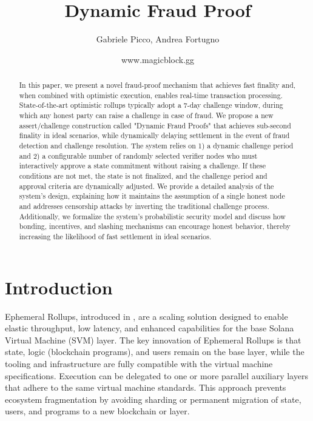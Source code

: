 \documentclass{article}
\title{\textbf{Dynamic Fraud Proof}}
\author{Gabriele Picco, Andrea Fortugno}
\date{www.magicblock.gg}
\begin{document}
\maketitle

\begin{abstract} 

In this paper, we present a novel fraud-proof mechanism that achieves fast finality and, when combined with optimistic execution, enables real-time transaction processing. State-of-the-art optimistic rollups typically adopt a 7-day challenge window, during which any honest party can raise a challenge in case of fraud. We propose a new assert/challenge construction called "Dynamic Fraud Proofs" that achieves sub-second finality in ideal scenarios, while dynamically delaying settlement in the event of fraud detection and challenge resolution. The system relies on 1) a dynamic challenge period and 2) a configurable number of randomly selected verifier nodes who must interactively approve a state commitment without raising a challenge. If these conditions are not met, the state is not finalized, and the challenge period and approval criteria are dynamically adjusted.
We provide a detailed analysis of the system's design, explaining how it maintains the assumption of a single honest node and addresses censorship attacks by inverting the traditional challenge process. Additionally, we formalize the system's probabilistic security model and discuss how bonding, incentives, and slashing mechanisms can encourage honest behavior, thereby increasing the likelihood of fast settlement in ideal scenarios.

\end{abstract}

\section{Introduction}

Ephemeral Rollups, introduced in \cite{picco2023ephemeral}, are a scaling solution designed to enable elastic throughput, low latency, and enhanced capabilities for the base Solana Virtual Machine (SVM) layer. The key innovation of Ephemeral Rollups is that state, logic (blockchain programs), and users remain on the base layer, while the tooling and infrastructure are fully compatible with the virtual machine specifications. Execution can be delegated to one or more parallel auxiliary layers that adhere to the same virtual machine standards. This approach prevents ecosystem fragmentation by avoiding sharding or permanent migration of state, users, and programs to a new blockchain or layer.
\end{document}

